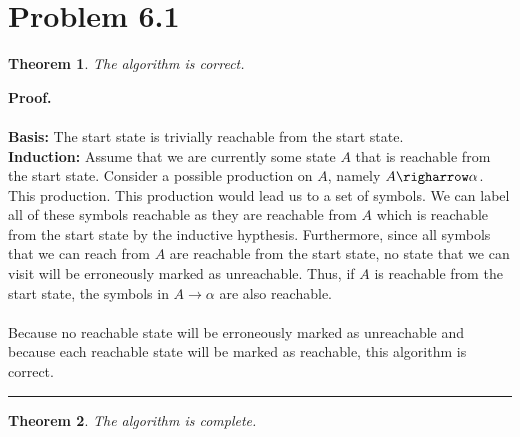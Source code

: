 \documentclass{article}%
\newtheorem{theorem}{Theorem}
\newenvironment{proof}[1][Proof]{\noindent\textbf{#1.} }{\ \rule{0.5em}{0.5em}}
\begin{document}
\lstset{language=Java}
\lstset{showstringspaces=false}

\section*{Problem 6.1}
\begin{theorem}
    The algorithm is correct.
\end{theorem}

\begin{proof}\\
    \\
    \textbf{Basis:} The start state is trivially reachable from the start state.
    \\[0.1in]
    \textbf{Induction:} Assume that we are currently some state $A$ that is reachable from the start state. Consider a possible production on $A$, namely $A \righarrow \alpha$. This production. This production would lead us to a set of symbols. We can label all of these symbols reachable as they are reachable from $A$ which is reachable from the start state by the inductive hypthesis. Furthermore, since all symbols that we can reach from $A$ are reachable from the start state, no state that we can visit will be erroneously marked as unreachable. Thus, if $A$ is reachable from the start state, the symbols in $A \rightarrow \alpha$ are also reachable.\\
    \\[0.1in]
    Because no reachable state will be erroneously marked as unreachable and because each reachable state will be marked as reachable, this algorithm is correct.
\end{proof}

\begin{theorem}
    The algorithm is complete.
\end{theorem}
\end{document}
